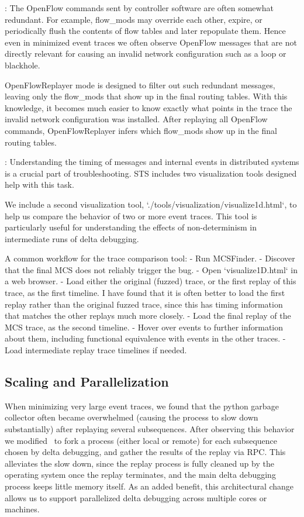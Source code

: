 :
The OpenFlow commands sent by controller software are often somewhat redundant. For
example, flow\_mods may override each other, expire, or periodically flush the
contents of flow tables and later repopulate them. Hence even in minimized event
traces we often observe OpenFlow messages that are not directly relevant
for causing an invalid network configuration such as a loop or blackhole.

OpenFlowReplayer mode is designed to filter out such redundant messages,
leaving only the flow\_mods that show up in the final routing tables.
With this knowledge, it becomes much easier to know exactly what points in
the trace the invalid network configuration was installed.
After replaying all OpenFlow commands, OpenFlowReplayer infers which
flow\_mods show up in the final routing tables.

:
Understanding the timing of messages and internal events in distributed systems is a crucial part of troubleshooting.
STS includes two visualization tools designed help with this task.

We include a second visualization tool, `./tools/visualization/visualize1d.html`, to help us compare
the behavior of two or more event traces. This tool is particularly useful for understanding the effects of non-determinism in
intermediate runs of delta debugging.

A common workflow for the trace comparison tool:
- Run MCSFinder.
- Discover that the final MCS does not reliably trigger the bug.
- Open `visualize1D.html` in a web browser.
- Load either the original (fuzzed) trace,
  or the first replay of this trace,
  as the first timeline. I have found that it is often better to load the
  first replay rather than the original fuzzed trace, since this has
  timing information that matches the other replays much more closely.
- Load the final replay of the MCS trace,
  as the second timeline.
- Hover over events to further information about them, including functional equivalence
  with events in the other traces.
- Load intermediate replay trace timelines if needed.

\subsection{Scaling and Parallelization}

When minimizing very large event traces, we found that the python garbage
collector often became overwhelmed (causing the process to slow down
substantially) after replaying several subsequences.
After observing this behavior we modified \projectname~to fork a process
(either local or remote) for each subsequence chosen by delta debugging,
and gather the results of the replay via RPC. This alleviates the slow down,
since the replay process is fully cleaned up by the operating system once the
replay terminates, and the
main delta debugging process keeps little memory itself.
As an added benefit, this architectural change allows us to support
parallelized delta debugging across multiple cores or machines.

